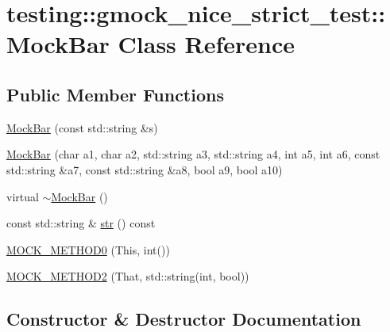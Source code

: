 \hypertarget{classtesting_1_1gmock__nice__strict__test_1_1MockBar}{}\section{testing\+::gmock\+\_\+nice\+\_\+strict\+\_\+test\+::Mock\+Bar Class Reference}
\label{classtesting_1_1gmock__nice__strict__test_1_1MockBar}
\subsection*{Public Member Functions}
\begin{DoxyCompactItemize}
\item 
\mbox{\hyperlink{classtesting_1_1gmock__nice__strict__test_1_1MockBar_abd4e7936dc389201ce608257f7a02584}{Mock\+Bar}} (const std\+::string \&s)
\item 
\mbox{\hyperlink{classtesting_1_1gmock__nice__strict__test_1_1MockBar_ad6b73066fdcdd71ac1add73ef56b53ef}{Mock\+Bar}} (char a1, char a2, std\+::string a3, std\+::string a4, int a5, int a6, const std\+::string \&a7, const std\+::string \&a8, bool a9, bool a10)
\item 
virtual \mbox{\hyperlink{classtesting_1_1gmock__nice__strict__test_1_1MockBar_a0559a3ecd9ecb4eebd5f519bf96bf03b}{$\sim$\+Mock\+Bar}} ()
\item 
const std\+::string \& \mbox{\hyperlink{classtesting_1_1gmock__nice__strict__test_1_1MockBar_adc0fb56c042e95e1a459bb007e813169}{str}} () const
\item 
\mbox{\hyperlink{classtesting_1_1gmock__nice__strict__test_1_1MockBar_a9aad688c2b1dc6b529b7c499e49e3a70}{M\+O\+C\+K\+\_\+\+M\+E\+T\+H\+O\+D0}} (This, int())
\item 
\mbox{\hyperlink{classtesting_1_1gmock__nice__strict__test_1_1MockBar_afa41d45dd7066f014f755f152ec16a73}{M\+O\+C\+K\+\_\+\+M\+E\+T\+H\+O\+D2}} (That, std\+::string(int, bool))
\end{DoxyCompactItemize}


\subsection{Constructor \& Destructor Documentation}
\mbox{\label{classtesting_1_1gmock__nice__strict__test_1_1MockBar_abd4e7936dc389201ce608257f7a02584}} 
